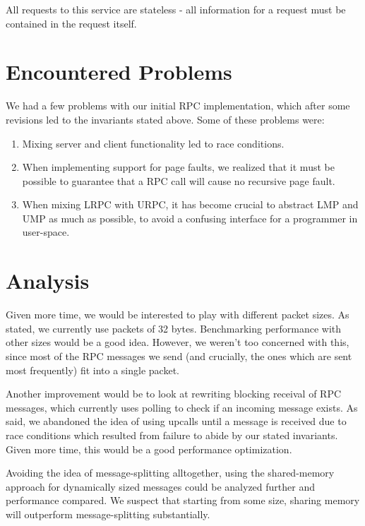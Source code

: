 All requests to this service are stateless - all information for a request must be 
contained in the request itself.


\section{Encountered Problems}
We had a few problems with our initial RPC implementation, 
which after some revisions led to the invariants stated above. Some of these problems were:
\begin{enumerate}
    \item Mixing server and client functionality led to race conditions.

    \item When implementing support for page faults, we realized that it must be possible 
to guarantee that a RPC call will cause no recursive page fault.

    \item When mixing LRPC with URPC, it has become crucial to abstract LMP and UMP as much 
as possible, to avoid a confusing interface for a programmer in user-space.
\end{enumerate}

\section{Analysis} %
Given more time, we would be interested to play with different packet sizes. As stated,
we currently use packets of 32 bytes. Benchmarking performance with other sizes 
would be a good idea. However, we weren't too concerned with this, since most of the RPC
messages we send (and crucially, the ones which are sent most frequently) fit into a single packet.

Another improvement would be to look at rewriting blocking receival of RPC messages,
which currently uses polling to check if an incoming message exists. As said, we 
abandoned the idea of using upcalls until a message is received due to race conditions 
which resulted from failure to abide by our stated invariants. Given more time, 
this would be a good performance optimization.

Avoiding the idea of message-splitting alltogether, 
using the shared-memory approach for dynamically sized messages could be 
analyzed further and performance compared. We suspect that starting from some size, 
sharing memory will outperform message-splitting substantially.


